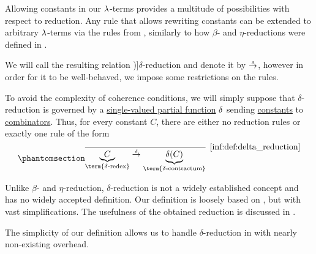 \begin{definition}\label{def:delta_reduction}
  Allowing constants in our \( \mathrm{\lambda} \)-terms provides a multitude of possibilities with respect to reduction. Any rule that allows rewriting constants can be extended to arbitrary \( \mathrm{\lambda} \)-terms via the rules from , similarly to how \( \beta \)- and \( \eta \)-reductions were defined in .

  We will call the resulting relation \term[en=\( \delta \)-reduction (\cite[def. 15.3.1]{Barendregt1984LambdaCalculus})]{\( \delta \)-reduction} and denote it by \( {\dred} \), however in order for it to be well-behaved, we impose some restrictions on the rules.

  To avoid the complexity of coherence conditions, we will simply suppose that \( \delta \)-reduction is governed by a \hyperref[def:set_valued_map/partial]{single-valued partial function} \( \op*{\delta} \) sending \hyperref[def:lambda_term/const]{constants} to \hyperref[def:lambda_combinator]{combinators}. Thus, for every constant \( C \), there are either no reduction rules or exactly one rule of the form
  \begin{equation*}\taglabel[\ensuremath{ \logic{Red}_{\delta_C} }]{inf:def:delta_reduction}
    \begin{prooftree}
      \infer0[\ref{inf:def:delta_reduction}]{ \underbrace{C}_{\T{\term{\( \delta \)-redex}}} \dred \underbrace{\op*{\delta}(C)}_{\T{\term{\( \delta \)-contractum}}} }.
    \end{prooftree}
  \end{equation*}
\end{definition}
\begin{comments}
  \item Unlike \( \beta \)- and \( \eta \)-reduction, \( \delta \)-reduction is not a widely established concept and has no widely accepted definition. Our definition is loosely based on , but with vast simplifications. The usefulness of the obtained reduction is discussed in .

  The simplicity of our definition allows us to handle \( \delta \)-reduction in  with nearly non-existing overhead.
\end{comments}

